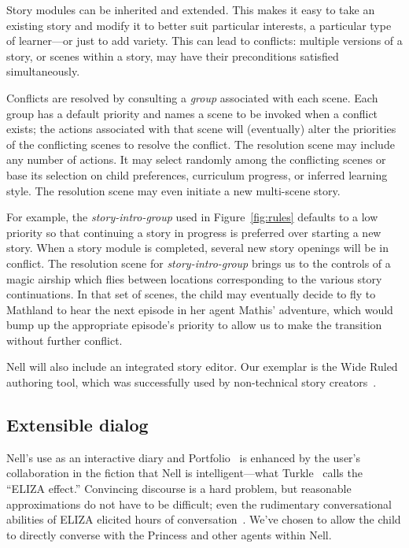 \documentclass[preprint]{sig-alternate}
\begin{document}
Story modules can be inherited and extended.
This makes it easy to take an existing story and modify it to
better suit particular interests, a particular type of learner---or
just to add variety.  This can lead to conflicts: multiple versions of
a story, or scenes within a story, may have their
preconditions satisfied simultaneously.

Conflicts are resolved by consulting a \textit{group} associated with
each scene.  Each group has a default priority and names a scene to be
invoked when a conflict exists; the actions associated with that scene
will (eventually) alter the priorities of the conflicting scenes to
resolve the conflict.  The resolution scene may include any number of
actions.  It may select randomly among the conflicting scenes or base
its selection on
child preferences, curriculum progress, or inferred learning style.
The resolution scene may even initiate a new multi-scene story.

For example, the \textit{story-intro-group}
used in Figure~\ref{fig:rules} defaults to a low priority so that
continuing a story in progress is preferred over starting a new story.
When a story module is completed, several new story openings will be in
conflict.  The resolution scene for \textit{story-intro-group} brings us
to the controls of a magic airship which flies between locations
corresponding to the various story continuations.  In that set of
scenes, the child may eventually decide to fly to Mathland to hear the
next episode in her agent Mathis' adventure, which would bump up the
appropriate episode's priority to allow us to make the transition
without further conflict.

Nell will also include an integrated story editor.  Our exemplar is
the Wide Ruled authoring tool, which was successfully used by
non-technical story creators~\cite{skorupski:2009}.


\subsection{Extensible dialog}
Nell's use as an interactive diary and
Portfolio~\cite{stefanakis:portfolios} is enhanced by the user's
collaboration in the fiction that Nell is intelligent---what
Turkle~\cite{turkle:alone} calls the ``ELIZA effect.''
Convincing discourse is a hard problem, but
reasonable approximations do not have to be difficult; even
the rudimentary conversational abilities of ELIZA elicited hours of
conversation~\cite{weizenbaum:power}.
We've chosen to allow the child to directly converse with the
Princess and other agents within Nell.
\end{document}
